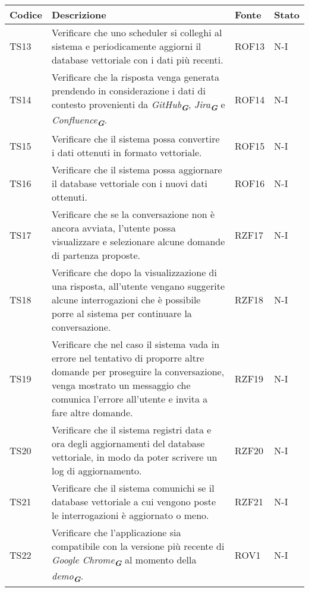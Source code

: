 \newpage


\begin{table}[h!]
    \centering
    \renewcommand{\arraystretch}{1.5}
    \begin{tabularx}{\textwidth}{|p{}|X|p{}|p{}|}\hline
    \rowcolor[HTML]{FFD700}
    \textbf{Codice} & \textbf{Descrizione} & \textbf{Fonte} & \textbf{Stato} \\ \hline
    TS13 & Verificare che uno scheduler si colleghi al sistema e periodicamente aggiorni il database vettoriale con i dati più recenti. & ROF13 & N-I \\ \hline
    TS14 & Verificare che la risposta venga generata prendendo in considerazione i dati di contesto provenienti da \emph{GitHub}\textsubscript{\textit{\textbf{G}}}, \emph{Jira}\textsubscript{\textit{\textbf{G}}} e \emph{Confluence}\textsubscript{\textit{\textbf{G}}}. & ROF14 & N-I \\ \hline
    TS15 & Verificare che il sistema possa convertire i dati ottenuti in formato vettoriale. & ROF15 & N-I \\ \hline
    TS16 & Verificare che il sistema possa aggiornare il database vettoriale con i nuovi dati ottenuti. & ROF16 & N-I \\ \hline
    TS17 & Verificare che se la conversazione non è ancora avviata, l'utente possa visualizzare e selezionare alcune domande di partenza proposte. & RZF17 & N-I \\ \hline
    TS18 & Verificare che dopo la visualizzazione di una risposta, all'utente vengano suggerite alcune interrogazioni che è possibile porre al sistema per continuare la conversazione. & RZF18 & N-I \\ \hline
    TS19 & Verificare che nel caso il sistema vada in errore nel tentativo di proporre altre domande per proseguire la conversazione, venga mostrato un messaggio che comunica l'errore all'utente e invita a fare altre domande. & RZF19 & N-I \\ \hline
    TS20 & Verificare che il sistema registri data e ora degli aggiornamenti del database vettoriale, in modo da poter scrivere un log di aggiornamento. & RZF20 & N-I \\ \hline
    TS21 & Verificare che il sistema comunichi se il database vettoriale a cui vengono poste le interrogazioni è aggiornato o meno. & RZF21 & N-I \\ \hline
    TS22 & Verificare che l'applicazione sia compatibile con la versione più recente di \emph{Google Chrome}\textsubscript{\textit{\textbf{G}}} al momento della \emph{demo}\textsubscript{\textit{\textbf{G}}}. & ROV1 & N-I \\ \hline

\end{tabularx}
\end{table}
